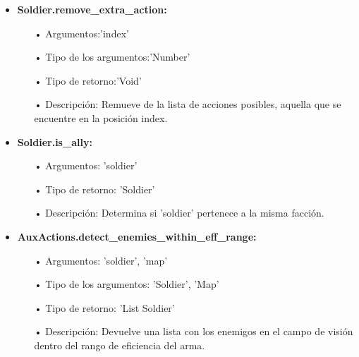 \documentclass[twoside]{article}
\begin{document}
\begin{itemize}
			\item \textbf{Soldier.remove\_extra\_action:\\}
			\begin{itemize}
				\item[•] Argumentos:'index' \\ 
				\item[•] Tipo de los argumentos:'Number' \\ 
				\item[•] Tipo de retorno:'Void'\\
				\item[•] Descripci\'on: Remueve de la lista de acciones posibles, aquella que se encuentre en la posici\'on index.
			\end{itemize}\vspace{0.2cm}
			
			\item \textbf{Soldier.is\_ally:\\}
			\begin{itemize}
				\item[•] Argumentos: 'soldier' \\ 
				\item[•] Tipo de retorno: 'Soldier'\\
				\item[•] Descripci\'on: Determina si 'soldier' pertenece a la misma facci\'on.
			\end{itemize}\vspace{0.2cm}
			
			\item \textbf{AuxActions.detect\_enemies\_within\_eff\_range:\\}
			\begin{itemize}
				\item[•] Argumentos: 'soldier', 'map'\\
				\item[•] Tipo de los argumentos: 'Soldier', 'Map'\\ 
				\item[•] Tipo de retorno: 'List Soldier'\\
				\item[•] Descripci\'on: Devuelve una lista con los enemigos en el campo de visi\'on dentro del rango de eficiencia del arma. 
			\end{itemize}\vspace{0.2cm}
			

\end{itemize}
\end{document}
